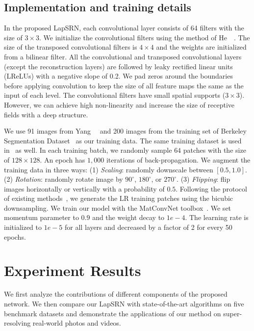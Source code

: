 \documentclass[10pt,twocolumn,letterpaper]{article}
\begin{document}
	\subsection{Implementation and training details}
	\vspace{-0.1cm}
	In the proposed LapSRN, each convolutional layer consists of 64 filters with the size of $3\times3$. 
	We initialize the convolutional filters using the method of He~\etal~\cite{He-ICCV-2015}. 
	The size of the transposed convolutional filters is $4 \times 4$ and the weights are initialized from a bilinear filter.
	All the convolutional and transposed convolutional layers (except the reconstruction layers) are followed by leaky rectified linear units (LReLUs) with a negative slope of 0.2.
	We pad zeros around the boundaries before applying convolution to keep the size of all feature maps the same as the input of each level.
	The convolutional filters have small spatial supports ($3\times3$). 
	However, we can achieve high non-linearity and increase the size of receptive fields with a deep structure.
	
	We use 91 images from Yang~\etal~\cite{Yang-TIP-2010} and 200 images from the training set of Berkeley Segmentation Dataset~\cite{BSDS} as our training data.
	The same training dataset is used in~\cite{VDSR,RFL} as well.
	In each training batch, we randomly sample $64$ patches with the size of $128 \times 128$.
	An epoch has $1,000$ iterations of back-propagation. 
	We augment the training data in three ways: 
	(1) \emph{Scaling}: randomly downscale between $[0.5, 1.0]$.
	(2) \emph{Rotation}: randomly rotate image by $90^\circ$, $180^\circ$, or $270^\circ$.
	(3) \emph{Flipping}: flip images horizontally or vertically with a probability of $0.5$. 
	Following the protocol of existing methods~\cite{SRCNN,VDSR}, we generate the LR training patches using the bicubic downsampling.
	We train our model with the MatConvNet toolbox~\cite{Vedaldi-ACMMM-2015}.
	We set momentum parameter to $0.9$ and the weight decay to $1e-4$. 
	The learning rate is initialized to $1e-5$ for all layers and decreased by a factor of 2 for every 50 epochs.
	
	\section{Experiment Results}
	\label{sec:experiments}
	We first analyze the contributions of different components of the proposed network.
	We then compare our LapSRN with state-of-the-art algorithms on five benchmark datasets and demonstrate the applications of our method on super-resolving real-world photos and videos.
	
\end{document}
